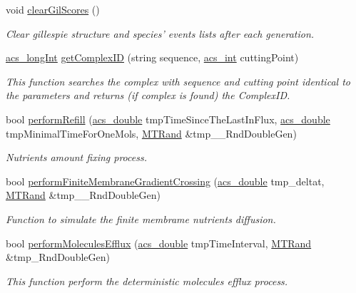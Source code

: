 \begin{DoxyCompactItemize}
void \hyperlink{a00003_aa33d7b81db9632c8ba1f9ce3f362df8e}{clear\-Gil\-Scores} ()
\begin{DoxyCompactList}\small\item\em Clear gillespie structure and species' events lists after each generation. \end{DoxyCompactList}\item 
\hyperlink{a00016_a19319d75f02db4308bc5c0026d98cd85}{acs\-\_\-long\-Int} \hyperlink{a00003_aa88b64fa5005973926a121f1aa46770d}{get\-Complex\-I\-D} (string sequence, \hyperlink{a00016_a8d277355641a098190360234e2ebde35}{acs\-\_\-int} cutting\-Point)
\begin{DoxyCompactList}\small\item\em This function searches the complex with sequence and cutting point identical to the parameters and returns (if complex is found) the Complex\-I\-D. \end{DoxyCompactList}\item 
bool \hyperlink{a00003_a8a53821ad1675b0da50591616aac3b74}{perform\-Refill} (\hyperlink{a00016_ab776853a005fcbf56af0424a2a4dd607}{acs\-\_\-double} tmp\-Time\-Since\-The\-Last\-In\-Flux, \hyperlink{a00016_ab776853a005fcbf56af0424a2a4dd607}{acs\-\_\-double} tmp\-Minimal\-Time\-For\-One\-Mols, \hyperlink{a00008}{M\-T\-Rand} \&tmp\-\_\-\-\_\-\-Rnd\-Double\-Gen)
\begin{DoxyCompactList}\small\item\em Nutrients amount fixing process. \end{DoxyCompactList}\item 
bool \hyperlink{a00003_ad714dd5a6f4bab1f418d3426216f4179}{perform\-Finite\-Membrane\-Gradient\-Crossing} (\hyperlink{a00016_ab776853a005fcbf56af0424a2a4dd607}{acs\-\_\-double} tmp\-\_\-deltat, \hyperlink{a00008}{M\-T\-Rand} \&tmp\-\_\-\-\_\-\-Rnd\-Double\-Gen)
\begin{DoxyCompactList}\small\item\em Function to simulate the finite membrame nutrients diffusion. \end{DoxyCompactList}\item 
bool \hyperlink{a00003_acbbcdb4c77231e9ffa4c169e0caa0d0c}{perform\-Molecules\-Efflux} (\hyperlink{a00016_ab776853a005fcbf56af0424a2a4dd607}{acs\-\_\-double} tmp\-Time\-Interval, \hyperlink{a00008}{M\-T\-Rand} \&tmp\-\_\-\-Rnd\-Double\-Gen)
\begin{DoxyCompactList}\small\item\em This function perform the deterministic molecules efflux process. \end{DoxyCompactList}\item 

\end{DoxyCompactItemize}
